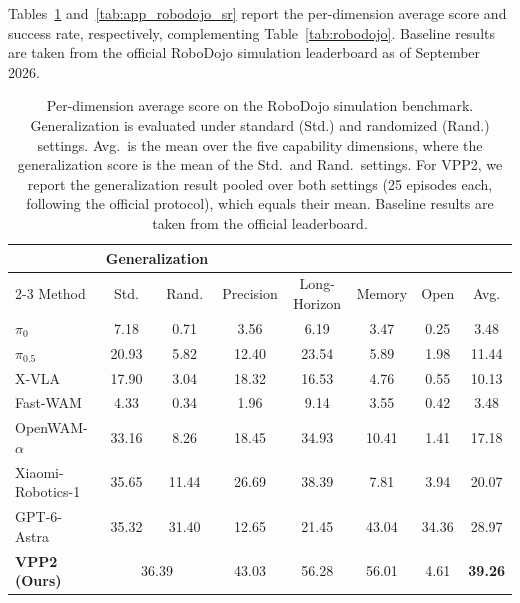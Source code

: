 Tables~\ref{tab:app_robodojo_score} and~\ref{tab:app_robodojo_sr} report the per-dimension average score and success rate, respectively, complementing Table~\ref{tab:robodojo}. Baseline results are taken from the official RoboDojo simulation leaderboard as of September 2026.

\begin{table}[h]
\centering
\small
\setlength{\tabcolsep}{3.5pt}
\begin{tabular}{lccccccc}
\toprule
 & \multicolumn{2}{c}{Generalization} & & & & & \\
\cmidrule(lr){2-3}
Method & Std. & Rand. & Precision & Long-Horizon & Memory & Open & Avg. \\
\midrule
$\pi_0$~\citep{black2024pi_0} & 7.18 & 0.71 & 3.56 & 6.19 & 3.47 & 0.25 & 3.48 \\
$\pi_{0.5}$~\citep{intelligence2025pi_} & 20.93 & 5.82 & 12.40 & 23.54 & 5.89 & 1.98 & 11.44 \\
X-VLA~\citep{zheng2026xvla} & 17.90 & 3.04 & 18.32 & 16.53 & 4.76 & 0.55 & 10.13 \\
Fast-WAM~\citep{yuan2026fastwam} & 4.33 & 0.34 & 1.96 & 9.14 & 3.55 & 0.42 & 3.48 \\
OpenWAM-$\alpha$~\citep{wang2026openwam} & 33.16 & 8.26 & 18.45 & 34.93 & 10.41 & 1.41 & 17.18 \\
Xiaomi-Robotics-1~\citep{guo2026xiaomirobotics1} & 35.65 & 11.44 & 26.69 & 38.39 & 7.81 & 3.94 & 20.07 \\
GPT-6-Astra~\citep{zhang2026astra} & 35.32 & 31.40 & 12.65 & 21.45 & 43.04 & 34.36 & 28.97 \\
\midrule
\textbf{VPP2 (Ours)} & \multicolumn{2}{c}{36.39} & 43.03 & 56.28 & 56.01 & 4.61 & \textbf{39.26} \\
\bottomrule
\end{tabular}
\caption{Per-dimension average score on the RoboDojo simulation benchmark. Generalization is evaluated under standard (Std.) and randomized (Rand.) settings. Avg.\ is the mean over the five capability dimensions, where the generalization score is the mean of the Std.\ and Rand.\ settings. For VPP2, we report the generalization result pooled over both settings (25 episodes each, following the official protocol), which equals their mean. Baseline results are taken from the official leaderboard.}
\label{tab:app_robodojo_score}
\end{table}

